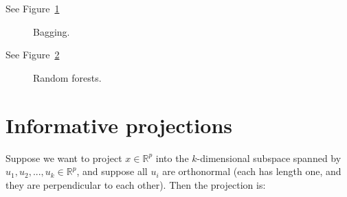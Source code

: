  See Figure~\ref{fig:bagging_mar}
\begin{figure}[H]
	\caption{Bagging.}
	\label{fig:bagging_mar}
\end{figure}


 See Figure~\ref{fig:random_forest_mar}
\begin{figure}[H]
	\caption{Random forests.}
	\label{fig:random_forest_mar}
\end{figure}

\section{Informative projections} 

 Suppose we want to project $x \in \mathbb{R}^p$
into the $k$-dimensional subspace spanned by $u_1, u_2, ..., u_k \in \mathbb{R}^p$, 
and suppose all $u_i$ are orthonormal (each has length one, and they are perpendicular to 
each other). Then the projection is:

